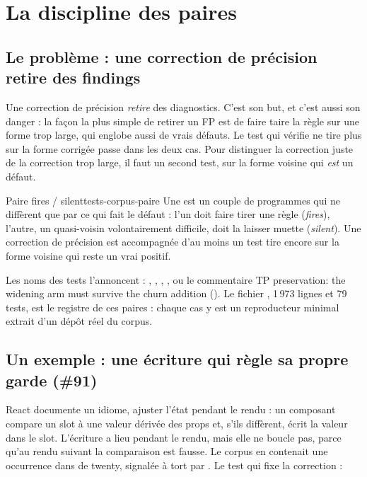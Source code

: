 \section{La discipline des paires}
\label{sec:tests-corpus-paires}

\subsection{Le problème : une correction de précision retire des findings}

Une correction de précision \emph{retire} des diagnostics. C'est son but, et c'est aussi son danger : la façon la plus simple de retirer un FP est de faire taire la règle sur une forme trop large, qui englobe aussi de vrais défauts. Le test qui vérifie \og ne tire plus\fg{} sur la forme corrigée passe dans les deux cas. Pour distinguer la correction juste de la correction trop large, il faut un second test, sur la forme voisine qui \emph{est} un défaut.

\begin{definition}{Paire fires / silent}{tests-corpus-paire}
Une  est un couple de programmes qui ne diffèrent que par ce qui fait le défaut : l'un doit faire tirer une règle (\emph{fires}), l'autre, un quasi-voisin volontairement difficile, doit la laisser muette (\emph{silent}). Une correction de précision est accompagnée d'au moins un test \og tire encore\fg{} sur la forme voisine qui reste un vrai positif.
\end{definition}

Les noms des tests l'annoncent : , , , , ou le commentaire \og TP preservation: the widening arm must survive the churn addition\fg{} (). Le fichier , 1\,973 lignes et 79 tests, est le registre de ces paires : chaque cas y est un reproducteur minimal extrait d'un dépôt réel du corpus.

\subsection{Un exemple : une écriture qui règle sa propre garde (\#91)}

React documente un idiome, \og ajuster l'état pendant le rendu\fg{} : un composant compare un slot à une valeur dérivée des props et, s'ils diffèrent, écrit la valeur dans le slot. L'écriture a lieu pendant le rendu, mais elle ne boucle pas, parce qu'au rendu suivant la comparaison est fausse. Le corpus en contenait une occurrence dans  de twenty, signalée à tort par . Le test qui fixe la correction :


